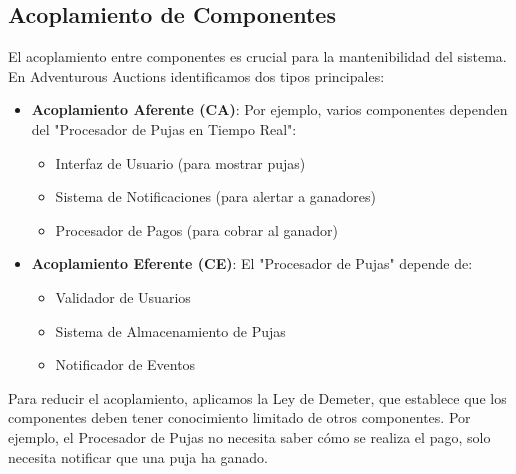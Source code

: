 \subsection{Acoplamiento de Componentes}

El acoplamiento entre componentes es crucial para la mantenibilidad del sistema. En Adventurous Auctions identificamos dos tipos principales:

\begin{itemize}
    \item \textbf{Acoplamiento Aferente (CA)}: Por ejemplo, varios componentes dependen del "Procesador de Pujas en Tiempo Real":
        \begin{itemize}
            \item Interfaz de Usuario (para mostrar pujas)
            \item Sistema de Notificaciones (para alertar a ganadores)
            \item Procesador de Pagos (para cobrar al ganador)
        \end{itemize}
    
    \item \textbf{Acoplamiento Eferente (CE)}: El "Procesador de Pujas" depende de:
        \begin{itemize}
            \item Validador de Usuarios
            \item Sistema de Almacenamiento de Pujas
            \item Notificador de Eventos
        \end{itemize}
\end{itemize}

Para reducir el acoplamiento, aplicamos la Ley de Demeter, que establece que los componentes deben tener conocimiento limitado de otros componentes. Por ejemplo, el Procesador de Pujas no necesita saber cómo se realiza el pago, solo necesita notificar que una puja ha ganado.